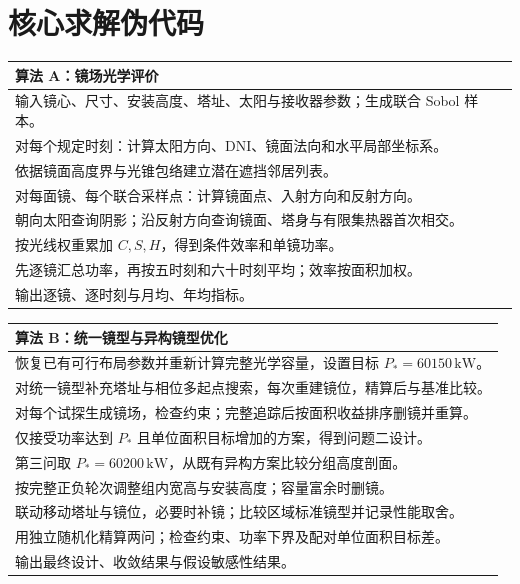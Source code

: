 \documentclass[UTF8,a4paper,zihao=-4,fontset=mac]{ctexart}
\newcommand{\DNI}{\mathrm{DNI}}
\begin{document}
\section{核心求解伪代码}
\begin{table}[H]
\centering\small
\begin{tabular}{p{150mm}}
\toprule
\textbf{算法 A：镜场光学评价}\\\midrule
输入镜心、尺寸、安装高度、塔址、太阳与接收器参数；生成联合 Sobol 样本。\\
对每个规定时刻：计算太阳方向、$\DNI$、镜面法向和水平局部坐标系。\\
依据镜面高度界与光锥包络建立潜在遮挡邻居列表。\\
对每面镜、每个联合采样点：计算镜面点、入射方向和反射方向。\\
朝向太阳查询阴影；沿反射方向查询镜面、塔身与有限集热器首次相交。\\
按光线权重累加 $C,S,H$，得到条件效率和单镜功率。\\
先逐镜汇总功率，再按五时刻和六十时刻平均；效率按面积加权。\\
输出逐镜、逐时刻与月均、年均指标。\\\bottomrule
\end{tabular}
\end{table}

\begin{table}[H]
\centering\small
\begin{tabular}{p{150mm}}
\toprule
\textbf{算法 B：统一镜型与异构镜型优化}\\\midrule
恢复已有可行布局参数并重新计算完整光学容量，设置目标 $P_*=60150\,\mathrm{kW}$。\\
对统一镜型补充塔址与相位多起点搜索，每次重建镜位，精算后与基准比较。\\
对每个试探生成镜场，检查约束；完整追踪后按面积收益排序删镜并重算。\\
仅接受功率达到 $P_*$ 且单位面积目标增加的方案，得到问题二设计。\\
第三问取 $P_*=60200\,\mathrm{kW}$，从既有异构方案比较分组高度剖面。\\
按完整正负轮次调整组内宽高与安装高度；容量富余时删镜。\\
联动移动塔址与镜位，必要时补镜；比较区域标准镜型并记录性能取舍。\\
用独立随机化精算两问；检查约束、功率下界及配对单位面积目标差。\\
输出最终设计、收敛结果与假设敏感性结果。\\\bottomrule
\end{tabular}
\end{table}
\end{document}
